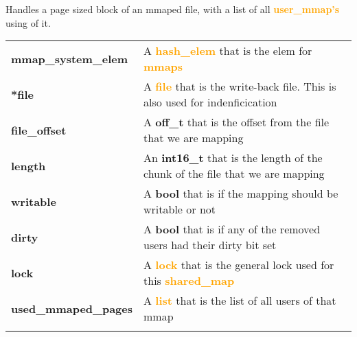 \documentclass{report}
\newcommand{\file}[1]{\textcolor{YellowGreen}{\textbf{#1}}}
\newcommand{\struct}[1]{\textcolor{orange}{\textbf{#1}}}
\newcommand{\var}[1]{\textcolor{RoyalPurple}{\textbf{#1}}}
\newcommand{\const}[1]{\textcolor{BrickRed}{\textbf{#1}}}
\newcommand{\pintoscode}[4]{}
\newcommand{\pintosfile}[3]{\pintoscode{#1}{#2}{\file{#3}}{#3}}
\begin{document}
{				%
				\pintosfile{45}{57}{mmap.c}
				Handles a page sized block of an mmaped file, with a list of all 
				\struct{user\_mmap's} using of it. \\
				\begin{center}
					\begin{tabular}{l p{10cm}}
							\vspace*{2mm}
							\var{mmap\_system\_elem}  & A \struct{hash\_elem} that is the elem for \struct{mmaps} \\ \vspace*{2mm}
							\var{*file}               & A \struct{file} that is the write-back file. This is also used for indenficication \\ \vspace*{2mm}
							\var{file\_offset}        & A \const{off\_t} that is the offset from the file that we are mapping \\ \vspace*{2mm}
							\var{length}              & An \const{int16\_t} that is the length of the chunk of the file that we are mapping \\ \vspace*{2mm}
							\var{writable}            & A \const{bool} that is if the mapping should be writable or not \\ \vspace*{2mm}
							\var{dirty}               & A \const{bool} that is if any of the removed users had their dirty bit set \\ \vspace*{2mm}
							\var{lock}                & A \struct{lock} that is the general lock used for this \struct{shared\_map}\\ \vspace*{2mm}
							\var{used\_mmaped\_pages} & A \struct{list} that is the list of all users of that mmap \\ \vspace*{2mm}
					\end{tabular}
				\end{center}
				
}
\end{document}
